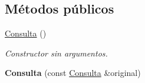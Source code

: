 \subsection*{\-Métodos públicos}
\begin{DoxyCompactItemize}
\item 
\hypertarget{classConsulta_a941db28c9c5f5606fcbfcbd76a4381a7}{\hyperlink{classConsulta_a941db28c9c5f5606fcbfcbd76a4381a7}{\-Consulta} ()}\label{classConsulta_a941db28c9c5f5606fcbfcbd76a4381a7}

\begin{DoxyCompactList}\small\item\em \-Constructor sin argumentos. \end{DoxyCompactList}\item 
\hypertarget{classConsulta_afab55aa5839f10dada36ebe7d6363ca5}{{\bfseries \-Consulta} (const \hyperlink{classConsulta}{\-Consulta} \&original)}\label{classConsulta_afab55aa5839f10dada36ebe7d6363ca5}


\end{DoxyCompactItemize}
